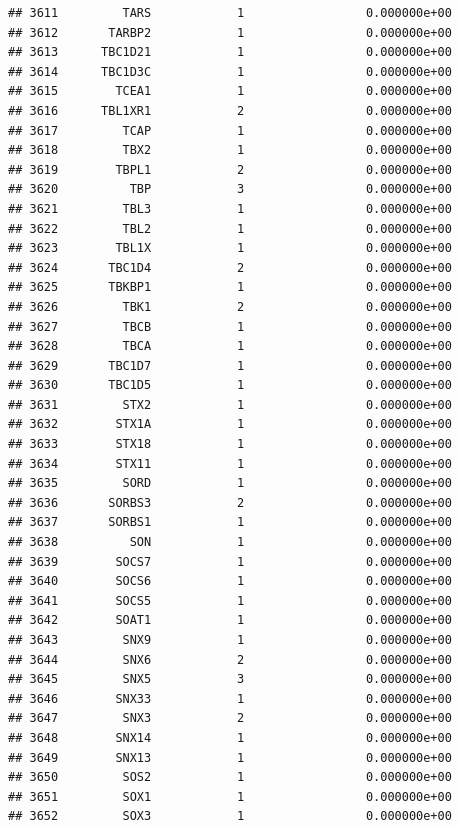 \documentclass[
]{article}
\begin{document}
\begin{verbatim}
## 3611         TARS            1                 0.000000e+00
## 3612       TARBP2            1                 0.000000e+00
## 3613      TBC1D21            1                 0.000000e+00
## 3614      TBC1D3C            1                 0.000000e+00
## 3615        TCEA1            1                 0.000000e+00
## 3616      TBL1XR1            2                 0.000000e+00
## 3617         TCAP            1                 0.000000e+00
## 3618         TBX2            1                 0.000000e+00
## 3619        TBPL1            2                 0.000000e+00
## 3620          TBP            3                 0.000000e+00
## 3621         TBL3            1                 0.000000e+00
## 3622         TBL2            1                 0.000000e+00
## 3623        TBL1X            1                 0.000000e+00
## 3624       TBC1D4            2                 0.000000e+00
## 3625       TBKBP1            1                 0.000000e+00
## 3626         TBK1            2                 0.000000e+00
## 3627         TBCB            1                 0.000000e+00
## 3628         TBCA            1                 0.000000e+00
## 3629       TBC1D7            1                 0.000000e+00
## 3630       TBC1D5            1                 0.000000e+00
## 3631         STX2            1                 0.000000e+00
## 3632        STX1A            1                 0.000000e+00
## 3633        STX18            1                 0.000000e+00
## 3634        STX11            1                 0.000000e+00
## 3635         SORD            1                 0.000000e+00
## 3636       SORBS3            2                 0.000000e+00
## 3637       SORBS1            1                 0.000000e+00
## 3638          SON            1                 0.000000e+00
## 3639        SOCS7            1                 0.000000e+00
## 3640        SOCS6            1                 0.000000e+00
## 3641        SOCS5            1                 0.000000e+00
## 3642        SOAT1            1                 0.000000e+00
## 3643         SNX9            1                 0.000000e+00
## 3644         SNX6            2                 0.000000e+00
## 3645         SNX5            3                 0.000000e+00
## 3646        SNX33            1                 0.000000e+00
## 3647         SNX3            2                 0.000000e+00
## 3648        SNX14            1                 0.000000e+00
## 3649        SNX13            1                 0.000000e+00
## 3650         SOS2            1                 0.000000e+00
## 3651         SOX1            1                 0.000000e+00
## 3652         SOX3            1                 0.000000e+00

\end{verbatim}
\end{document}
